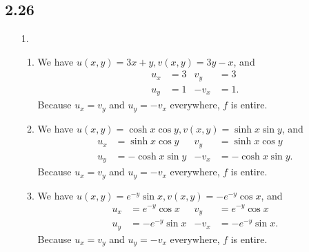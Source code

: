 \documentclass[a4paper,12pt]{article}
\begin{document}
\subsection*{2.26}
\begin{enumerate}
    \item[1.]
        \begin{enumerate}
            \item
                We have $u(x, y) = 3x + y, v(x, y) = 3y - x$, and
                \begin{align*}
                    u_x &= 3 &
                    v_y &= 3 \\
                    u_y &= 1 &
                    -v_x &= 1.
                \end{align*}
                Because $u_x = v_y$ and $u_y = -v_x$ everywhere, $f$ is entire.

            \item
                We have $u(x, y) = \cosh x \cos y, v(x, y) = \sinh x \sin y$, and
                \begin{align*}
                    u_x &= \sinh x \cos y &
                    v_y &= \sinh x \cos y \\
                    u_y &= -\cosh x \sin y &
                    -v_x &= -\cosh x \sin y.
                \end{align*}
                Because $u_x = v_y$ and $u_y = -v_x$ everywhere, $f$ is entire.

            \item
                We have $u(x, y) = e^{-y} \sin x, v(x, y) = -e^{-y} \cos x$, and
                \begin{align*}
                    u_x &= e^{-y} \cos x &
                    v_y &= e^{-y} \cos x \\
                    u_y &= -e^{-y} \sin x &
                    -v_x &= -e^{-y} \sin x.
                \end{align*}
                Because $u_x = v_y$ and $u_y = -v_x$ everywhere, $f$ is entire.


\end{enumerate}
\end{enumerate}
\end{document}
